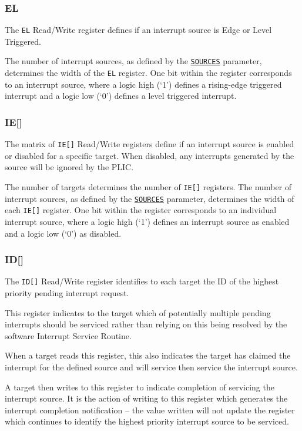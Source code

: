 \subsubsection{EL}

The \texttt{EL} Read/Write register defines if an interrupt source is
Edge or Level Triggered.

The number of interrupt sources, as defined by the
\protect\hyperlink{SOURCES}{\texttt{SOURCES}} parameter, determines
the width of the \texttt{EL} register. One bit within the register
corresponds to an interrupt source, where a logic high (`1') defines a
rising-edge triggered interrupt and a logic low (`0') defines a level
triggered interrupt.

\subsubsection{IE[]}

The matrix of \texttt{IE[]} Read/Write registers define if an
interrupt source is enabled or disabled for a specific target. When
disabled, any interrupts generated by the source will be ignored by the
PLIC.

The number of targets determines the number of \texttt{IE[]}
registers. The number of interrupt sources, as defined by the
\protect\hyperlink{SOURCES}{\texttt{SOURCES}} parameter, determines the
width of each \texttt{IE[]} register. One bit within the register
corresponds to an individual interrupt source, where a logic high (`1')
defines an interrupt source as enabled and a logic low (`0') as
disabled.

\subsubsection{ID[]}

The \texttt{ID[]} Read/Write register identifies to each target
the ID of the highest priority pending interrupt request.

This register indicates to the target which of potentially multiple
pending interrupts should be serviced rather than relying on this being
resolved by the software Interrupt Service Routine.

When a target reads this register, this also indicates the target has
claimed the interrupt for the defined source and will service then
service the interrupt source.

A target then writes to this register to indicate completion of
servicing the interrupt source. It is the action of writing to this
register which generates the interrupt completion notification -- the
value written will not update the register which continues to identify
the highest priority interrupt source to be serviced.


